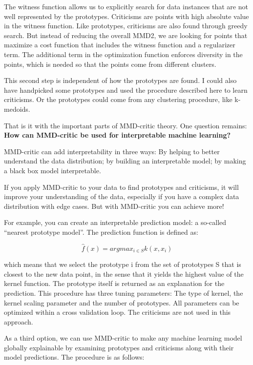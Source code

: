 \documentclass[
  10pt,
]{scrbook}
\begin{document}
The witness function allows us to explicitly search for data instances that are not well represented by the prototypes.
Criticisms are points with high absolute value in the witness function.
Like prototypes, criticisms are also found through greedy search.
But instead of reducing the overall MMD2, we are looking for points that maximize a cost function that includes the witness function and a regularizer term.
The additional term in the optimization function enforces diversity in the points, which is needed so that the points come from different clusters.

This second step is independent of how the prototypes are found.
I could also have handpicked some prototypes and used the procedure described here to learn criticisms.
Or the prototypes could come from any clustering procedure, like k-medoids.

That is it with the important parts of MMD-critic theory.
One question remains:
\textbf{How can MMD-critic be used for interpretable machine learning?}

MMD-critic can add interpretability in three ways:
By helping to better understand the data distribution;
by building an interpretable model;
by making a black box model interpretable.

If you apply MMD-critic to your data to find prototypes and criticisms, it will improve your understanding of the data, especially if you have a complex data distribution with edge cases.
But with MMD-critic you can achieve more!

For example, you can create an interpretable prediction model: a so-called ``nearest prototype model''.
The prediction function is defined as:

\[\hat{f}(x)=argmax_{i\in{}S}k(x,x_i)\]

which means that we select the prototype i from the set of prototypes S that is closest to the new data point, in the sense that it yields the highest value of the kernel function.
The prototype itself is returned as an explanation for the prediction.
This procedure has three tuning parameters:
The type of kernel, the kernel scaling parameter and the number of prototypes.
All parameters can be optimized within a cross validation loop.
The criticisms are not used in this approach.

As a third option, we can use MMD-critic to make any machine learning model globally explainable by examining prototypes and criticisms along with their model predictions.
The procedure is as follows:
\end{document}
